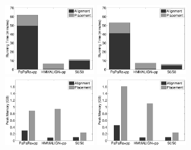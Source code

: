 \begin{figure}[htbp]
  \centering

{\label{fig:sts}\includegraphics[width=0.35\textwidth]{sepp/M2-time-sate}}
{\label{fig:stt}\includegraphics[width=0.35\textwidth]{sepp/M2-time-true}}
\\
{\label{fig:sms}\includegraphics[width=0.35\textwidth]{sepp/M2-mem-sate}}
{\label{fig:smt}\includegraphics[width=0.35\textwidth]{sepp/M2-mem-true}}
\\

\end{figure}
